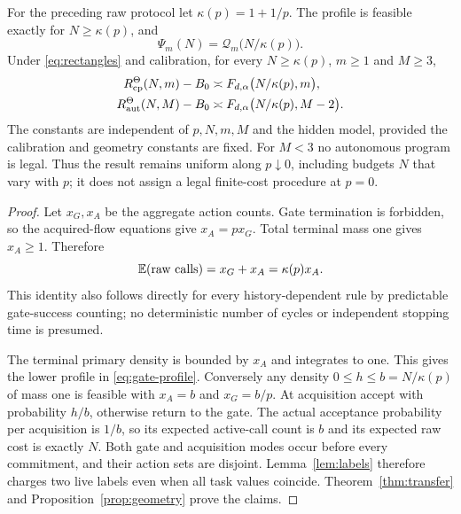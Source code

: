 \begin{theorem}\label{thm:gate}
For the preceding raw protocol let $\kappa(p)=1+1/p$. The profile is feasible exactly for $N\ge\kappa(p)$, and
\begin{equation}\label{eq:gate-profile}
 \Psi_m(N)=\mathcal Q_m\bigl(N/\kappa(p)\bigr).
\end{equation}
Under \eqref{eq:rectangles} and calibration, for every $N\ge\kappa(p)$, $m\ge1$ and $M\ge3$,
\begin{align}
 R_{\mathrm{cp}}^\Theta(N,m)-B_0&\asymp F_{d,\alpha}\bigl(N/\kappa(p),m\bigr),\label{eq:gate-cp}\\
 R_{\mathrm{aut}}^\Theta(N,M)-B_0&\asymp F_{d,\alpha}\bigl(N/\kappa(p),M-2\bigr).\label{eq:gate-aut}
\end{align}
The constants are independent of $p,N,m,M$ and the hidden model, provided the calibration and geometry constants are fixed. For $M<3$ no autonomous program is legal. Thus the result remains uniform along $p\downarrow0$, including budgets $N$ that vary with $p$; it does not assign a legal finite-cost procedure at $p=0$.
\end{theorem}
\begin{proof}
Let $x_G,x_A$ be the aggregate action counts. Gate termination is forbidden, so the acquired-flow equations give $x_A=px_G$. Total terminal mass one gives $x_A\ge1$. Therefore
\[
 \mathbb E(\text{raw calls})=x_G+x_A=\kappa(p)x_A.
\]
This identity also follows directly for every history-dependent rule by predictable gate-success counting; no deterministic number of cycles or independent stopping time is presumed.

The terminal primary density is bounded by $x_A$ and integrates to one. This gives the lower profile in \eqref{eq:gate-profile}. Conversely any density $0\le h\le b=N/\kappa(p)$ of mass one is feasible with $x_A=b$ and $x_G=b/p$. At acquisition accept with probability $h/b$, otherwise return to the gate. The actual acceptance probability per acquisition is $1/b$, so its expected active-call count is $b$ and its expected raw cost is exactly $N$. Both gate and acquisition modes occur before every commitment, and their action sets are disjoint. Lemma~\ref{lem:labels} therefore charges two live labels even when all task values coincide. Theorem~\ref{thm:transfer} and Proposition~\ref{prop:geometry} prove the claims.
\end{proof}

